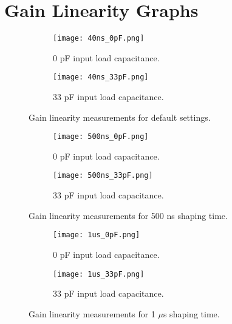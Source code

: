 \documentclass[../main/thesis.tex]{subfiles}
\begin{document}
\chapter{Gain Linearity Graphs}
\label{a-gainlin}

\begin{figure} [h!]%
	\centering
	\begin{subfigure}{.5\textwidth}
		\centering
		\texttt{[image: 40ns\_0pF.png]}
		\caption{0 pF input load capacitance.}
		\label{fig-gainlin-40-0}
	\end{subfigure}%
	\begin{subfigure}{.5\textwidth}
		\centering
		\texttt{[image: 40ns\_33pF.png]}
		\caption{33 pF input load capacitance.}
		\label{fig-gainlin-40-33} 
	\end{subfigure}
	\caption{Gain linearity measurements for default settings.}
	\label{fig-gainlin-def}
\end{figure}

\begin{figure} [h!]%
	\centering
	\begin{subfigure}{.5\textwidth}
		\centering
		\texttt{[image: 500ns\_0pF.png]}
		\caption{0 pF input load capacitance.}
		\label{fig-gainlin-500-0}
	\end{subfigure}%
	\begin{subfigure}{.5\textwidth}
		\centering
		\texttt{[image: 500ns\_33pF.png]}
		\caption{33 pF input load capacitance.}
		\label{fig-gainlin-500-33} 
	\end{subfigure}
	\caption{Gain linearity measurements for 500 ns shaping time.}
	\label{fig-gainlin-500}
\end{figure}

\begin{figure} %
	\centering
	\begin{subfigure}{.5\textwidth}
		\centering
		\texttt{[image: 1us\_0pF.png]}
		\caption{0 pF input load capacitance.}
		\label{fig-gainlin-1-0}
	\end{subfigure}%
	\begin{subfigure}{.5\textwidth}
		\centering
		\texttt{[image: 1us\_33pF.png]}
		\caption{33 pF input load capacitance.}
		\label{fig-gainlin-1-33} 
	\end{subfigure}
	\caption{Gain linearity measurements for 1 $\mu$s shaping time.}
	\label{fig-gainlin-1}
\end{figure}
\end{document}
